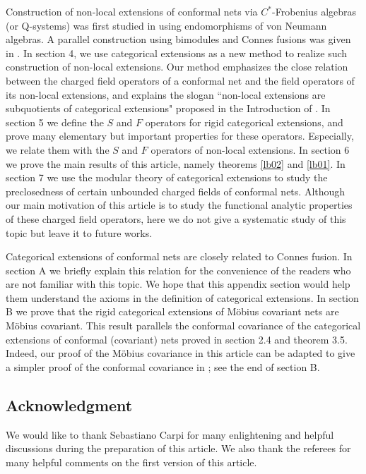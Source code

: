 \documentclass[12pt,a4paper]{article}
\theoremstyle{definition}
\theoremstyle{plain}
\numberwithin{equation}{section}
\begin{document}
Construction of non-local extensions of conformal nets via $C^*$-Frobenius algebras (or Q-systems) was first studied in \cite{LR95} using endomorphisms of von Neumann algebras. A parallel construction using bimodules and Connes fusions was given in \cite{Mas97}. In section 4, we use categorical extensions as a new method to realize such construction of non-local extensions. Our method emphasizes the close relation between the charged field operators of a conformal net and the field operators of its non-local extensions, and explains the slogan ``non-local extensions are subquotients of categorical extensions" proposed in the Introduction of \cite{Gui21a}. In section 5 we define the $S$ and $F$ operators for rigid categorical extensions, and prove many elementary but important properties for these operators. Especially, we relate them with the $S$ and $F$ operators of non-local extensions. In section 6 we prove the main results of this article, namely theorems \ref{lb02} and \ref{lb01}. In section 7 we use the modular theory of categorical extensions to study the preclosedness of certain unbounded charged fields of conformal nets. Although our main motivation of this article is to study the functional analytic properties of these  charged field operators, here we do not  give a systematic study of this topic but leave it to future works.

Categorical extensions of conformal nets are closely related to Connes fusion. In section A we briefly explain this relation for the convenience of the readers who are not familiar with this topic. We hope that this appendix section would help them understand the axioms in the definition of categorical extensions. In section B we prove that the rigid categorical extensions of M\"obius covariant nets are M\"obius covariant. This result parallels the conformal covariance of the categorical extensions of conformal (covariant) nets proved in \cite{Gui21a} section 2.4 and theorem 3.5. Indeed, our proof of the M\"obius covariance in this article can be adapted to give a simpler proof of the conformal covariance in \cite{Gui21a}; see the end of section B.


\subsection*{Acknowledgment}

We would like to thank Sebastiano Carpi for many enlightening and helpful discussions during the preparation of this article. We also thank the referees for  many helpful comments on the first version of this article.
\end{document}
